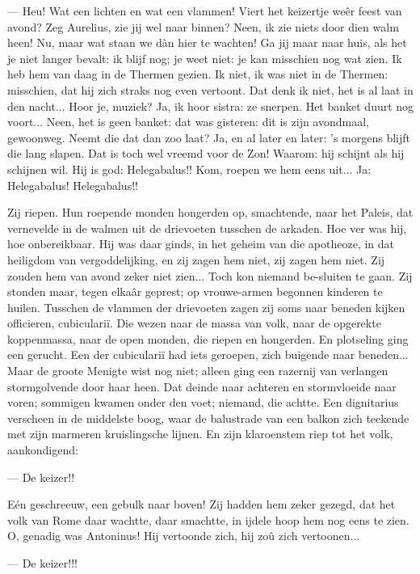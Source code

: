 \documentclass[a4paper, 12pt, oneside, dutch]{article}
\begin{document}
--- Heu! Wat een lichten en wat een vlammen! Viert het keizertje weêr feest van avond? Zeg Aurelius, zie jij wel naar binnen? Neen, ik zie niets door dien walm heen! Nu, maar wat staan we dàn hier te wachten! Ga jij maar naar huis, als het je niet langer bevalt: ik blijf nog; je weet niet: je kan misschien nog wat zien. Ik heb hem van daag in de Thermen gezien. Ik niet, ik was niet in de Thermen: misschien, dat hij zich straks nog even vertoont. Dat denk ik niet, het is al laat in den nacht... Hoor je, muziek? Ja, ik hoor sistra: ze snerpen. Het banket duurt nog voort... Neen, het is geen banket: dat was gisteren: dit is zijn avondmaal, gewoonweg. Neemt die dat dan zoo laat? Ja, en al later en later: 's morgens blijft die lang slapen. Dat is toch wel vreemd voor de Zon! Waarom: hij schijnt als hij schijnen wil. Hij is god: Helegabalus!! Kom, roepen we hem eens uit... Ja: Helegabalus! Helegabalus!!

Zij riepen. Hun roepende monden hongerden op, smachtende, naar het Paleis, dat vernevelde in de walmen uit de drievoeten tusschen de arkaden. Hoe ver was hij, hoe onbereikbaar. Hij was daar ginds, in het geheim van die apotheoze, in dat heiligdom van vergoddelijking, en zij zagen hem niet, zij zagen hem niet. Zij zouden hem van avond zeker niet zien... Toch kon niemand be-sluiten te gaan. Zij stonden maar, tegen elkaâr geprest; op vrouwe-armen begonnen kinderen te huilen. Tusschen de vlammen der drievoeten zagen zij soms naar beneden kijken officieren, cubiculariï. Die wezen naar de massa van volk, naar de opgerekte koppenmassa, naar de open monden, die riepen en hongerden. En plotseling ging een gerucht. Een der cubiculariï had iets geroepen, zich buigende naar beneden... Maar de groote Menigte wist nog niet; alleen ging een razernij van verlangen stormgolvende door haar heen. Dat deinde naar achteren en stormvloeide naar voren; sommigen kwamen onder den voet; niemand, die achtte. Een dignitarius verscheen in de middelste boog, waar de balustrade van een balkon zich teekende met zijn marmeren kruislingsche lijnen. En zijn klaroenstem riep tot het volk, aankondigend:

--- De keizer!!

Eén geschreeuw, een gebulk naar boven! Zij hadden hem zeker gezegd, dat het volk van Rome daar wachtte, daar smachtte, in ijdele hoop hem nog eens te zien. O, genadig was Antoninus! Hij vertoonde zich, hij zoû zich vertoonen...

--- De keizer!!!
\end{document}
